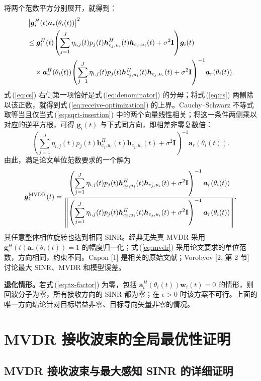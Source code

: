 \documentclass[11pt,a4paper]{ctexart}
\begin{document}
将两个范数平方分别展开，就得到：
\begin{align}
&\left|\bm g_i^H(t)\bm a_r(\theta_i(t))\right|^2\notag\\
&\le\bm g_i^H(t)\!\left(\sum_{j=1}^J\eta_{i,j}(t)p_j(t)
\bm h_{c_j,u_i}^{H}(t)\bm h_{c_j,u_i}(t)+\sigma^2\mathbf I\right)\!\bm g_i(t)\notag\\
&\quad\times\bm a_r^H(\theta_i(t))\!\left(\sum_{j=1}^J\eta_{i,j}(t)p_j(t)
\bm h_{c_j,u_i}^{H}(t)\bm h_{c_j,u_i}(t)+\sigma^2\mathbf I\right)^{-1}\!\bm a_r(\theta_i(t)).\label{eq:cs}
\end{align}
式\,(\ref{eq:cs}) 右侧第一项恰好是式\,(\ref{eq:denominator}) 的分母；将式\,(\ref{eq:cs}) 两侧除以该正数，就得到式\,(\ref{eq:receive-optimization}) 的上界。Cauchy--Schwarz 不等式取等当且仅当式\,(\ref{eq:sqrt-insertion}) 中的两个向量线性相关；将这一条件两侧乘以对应的逆平方根，可得 $\bm g_i(t)$ 与下式同方向，即相差非零复数倍：
\begin{equation}\label{eq:direction}
\left(\sum_{j=1}^J\eta_{i,j}(t)p_j(t)
\bm h_{c_j,u_i}^{H}(t)\bm h_{c_j,u_i}(t)+\sigma^2\mathbf I\right)^{-1}
\bm a_r(\theta_i(t)).
\end{equation}
由此，满足论文单位范数要求的一个解为
\begin{equation}\label{eq:mvdr}
\bm g_i^{\rm MVDR}(t)=
\frac{\left(\displaystyle\sum_{j=1}^J\eta_{i,j}(t)p_j(t)
\bm h_{c_j,u_i}^{H}(t)\bm h_{c_j,u_i}(t)+\sigma^2\mathbf I\right)^{-1}
\bm a_r(\theta_i(t))}
{\left\|\left(\displaystyle\sum_{j=1}^J\eta_{i,j}(t)p_j(t)
\bm h_{c_j,u_i}^{H}(t)\bm h_{c_j,u_i}(t)+\sigma^2\mathbf I\right)^{-1}
\bm a_r(\theta_i(t))\right\|}.
\end{equation}
其任意整体相位旋转也达到相同 SINR。经典无失真 MVDR 采用 $\bm g_i^H(t)\bm a_r(\theta_i(t))=1$ 的幅度归一化；式\,(\ref{eq:mvdr}) 采用论文要求的单位范数，方向相同，约束不同。Capon [1] 是相关的原始文献；Vorobyov [2, 第 2 节] 讨论最大 SINR、MVDR 和模型误差。

\textbf{退化情形。}若式\,(\ref{eq:tx-factor}) 为零，包括 $\bm a_t^H(\theta_i(t))\bm w_i(t)=0$ 的情形，则回波分子为零，所有接收方向的 SINR 都为零；在 $\epsilon>0$ 时该方案不可行。上面的唯一方向结论针对目标增益非零、目标导向矢量非零的情况。

\section{MVDR 接收波束的全局最优性证明}

\subsection{MVDR 接收波束与最大感知 SINR 的详细证明}
\end{document}
